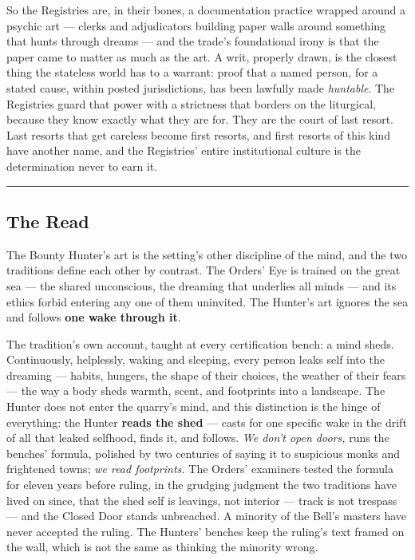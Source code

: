 So the Registries are, in their bones, a documentation practice wrapped around a psychic art --- clerks and adjudicators building paper walls around something that hunts through dreams --- and the trade's foundational irony is that the paper came to matter as much as the art. A writ, properly drawn, is the closest thing the stateless world has to a warrant: proof that a named person, for a stated cause, within posted jurisdictions, has been lawfully made \textit{huntable}. The Registries guard that power with a strictness that borders on the liturgical, because they know exactly what they are for. They are the court of last resort. Last resorts that get careless become first resorts, and first resorts of this kind have another name, and the Registries' entire institutional culture is the determination never to earn it.

\medskip\hrule\medskip

\subsection{The Read}

The Bounty Hunter's art is the setting's other discipline of the mind, and the two traditions define each other by contrast. The Orders' Eye is trained on the great sea --- the shared unconscious, the dreaming that underlies all minds --- and its ethics forbid entering any one of them uninvited. The Hunter's art ignores the sea and follows \textbf{one wake through it}.

The tradition's own account, taught at every certification bench: a mind sheds. Continuously, helplessly, waking and sleeping, every person leaks self into the dreaming --- habits, hungers, the shape of their choices, the weather of their fears --- the way a body sheds warmth, scent, and footprints into a landscape. The Hunter does not enter the quarry's mind, and this distinction is the hinge of everything: the Hunter \textbf{reads the shed} --- casts for one specific wake in the drift of all that leaked selfhood, finds it, and follows. \textit{We don't open doors,} runs the benches' formula, polished by two centuries of saying it to suspicious monks and frightened towns; \textit{we read footprints.} The Orders' examiners tested the formula for eleven years before ruling, in the grudging judgment the two traditions have lived on since, that the shed self is leavings, not interior --- track is not trespass --- and the Closed Door stands unbreached. A minority of the Bell's masters have never accepted the ruling. The Hunters' benches keep the ruling's text framed on the wall, which is not the same as thinking the minority wrong.

